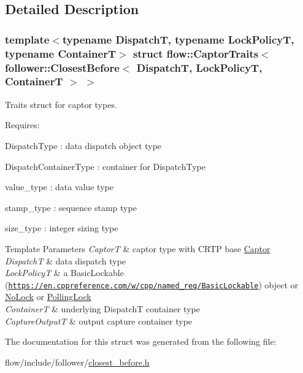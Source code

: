 \subsection{Detailed Description}
\subsubsection*{template$<$typename DispatchT, typename Lock\+PolicyT, typename ContainerT$>$\newline
struct flow\+::\+Captor\+Traits$<$ follower\+::\+Closest\+Before$<$ Dispatch\+T, Lock\+Policy\+T, Container\+T $>$ $>$}

Traits struct for captor types. 

Requires\+:
\begin{DoxyItemize}
\item {\ttfamily Dispatch\+Type} \+: data dispatch object type
\item {\ttfamily Dispatch\+Container\+Type} \+: container for {\ttfamily Dispatch\+Type}
\item {\ttfamily value\+\_\+type} \+: data value type
\item {\ttfamily stamp\+\_\+type} \+: sequence stamp type
\item {\ttfamily size\+\_\+type} \+: integer sizing type
\end{DoxyItemize}


\begin{DoxyTemplParams}{Template Parameters}
{\em CaptorT} & captor type with C\+R\+TP base {\ttfamily \hyperlink{classflow_1_1_captor}{Captor}}\\
\hline
{\em DispatchT} & data dispatch type \\
\hline
{\em Lock\+PolicyT} & a Basic\+Lockable (\href{https://en.cppreference.com/w/cpp/named_req/BasicLockable}{\tt https\+://en.\+cppreference.\+com/w/cpp/named\+\_\+req/\+Basic\+Lockable}) object or \hyperlink{structflow_1_1_no_lock}{No\+Lock} or \hyperlink{structflow_1_1_polling_lock}{Polling\+Lock} \\
\hline
{\em ContainerT} & underlying {\ttfamily DispatchT} container type \\
\hline
{\em Capture\+OutputT} & output capture container type \\
\hline
\end{DoxyTemplParams}


The documentation for this struct was generated from the following file\+:\begin{DoxyCompactItemize}
\item 
flow/include/follower/\hyperlink{closest__before_8h}{closest\+\_\+before.\+h}\end{DoxyCompactItemize}

